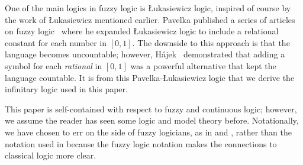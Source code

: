 \documentclass{amsart}
\theoremstyle{definition}
\numberwithin{equation}{theorem}
\begin{document}
One of the main logics in fuzzy logic is {\L}ukasiewicz logic, inspired of course by the work of {\L}ukasiewicz mentioned earlier.
Pavelka published a series of articles on fuzzy logic~\cite{pavelka1979fuzzy} where he expanded {\L}ukasiewicz logic to include a relational constant for each number in $[0,1]$. The downside to this approach is that the language becomes uncountable; however, H\'ajek~\cite{hajek1995fuzzy} demonstrated that adding a symbol for each \emph{rational} in $[0,1]$ was a powerful alternative that kept the language countable.
It is from this Pavelka-{\L}ukasiewicz logic that we derive the infinitary logic used in this paper.

This paper is self-contained with respect to fuzzy and continuous logic; however, we assume the reader has seen some logic and model theory before.
Notationally, we have chosen to err on the side of fuzzy logicians, as in \cite{hajek1998metamathematics} and \cite{metcalfe2008proof}, rather than the notation used in \cite{yaacov2008model} because the fuzzy logic notation makes the connections to classical logic more clear.
\end{document}
